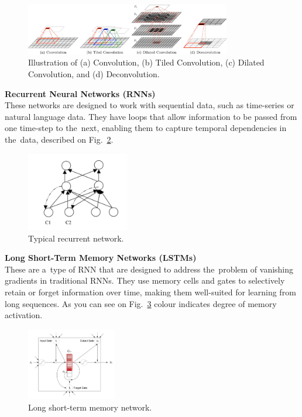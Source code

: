    \begin{center}
        \begin{figure}[]
            \centering
            \includegraphics[width=0.8\textwidth]{figures/cn}
            \caption{Illustration of (a) Convolution, (b) Tiled Convolution, (c) Dilated Convolution, and (d)
                Deconvolution. \cite{GU2018354}}
            \label{fig:cn}
        \end{figure}
    \end{center}
    \textbf{Recurrent Neural Networks (RNNs)}\\
    These networks are designed to work with sequential data, such as time-series or natural language data. They have loops that allow information to be passed from one time-step to the~next, enabling them to capture temporal dependencies in the~data, described on Fig.~\ref{fig:rn}.
        \begin{center}
        \begin{figure}[]
            \centering
            \includegraphics[width=0.4\textwidth]{figures/rn}
            \caption{Typical recurrent network. \cite{medsker2001recurrent}}
            \label{fig:rn}
        \end{figure}
    \end{center}
    \textbf{Long Short-Term Memory Networks (LSTMs)}\\
    These are a~type of RNN that are designed to address the~problem of vanishing gradients in traditional RNNs. They use memory cells and gates to selectively retain or forget information over time, making them well-suited for learning from long sequences. As you can see on Fig.~\ref{fig:ltmn} colour indicates degree of memory activation.
    \begin{center}
        \begin{figure}[]
            \centering
            \includegraphics[width=0.35\textwidth]{figures/ltmn}
            \caption{Long short-term memory network. \cite{cheng2016long}}
            \label{fig:ltmn}
        \end{figure}
    \end{center}
